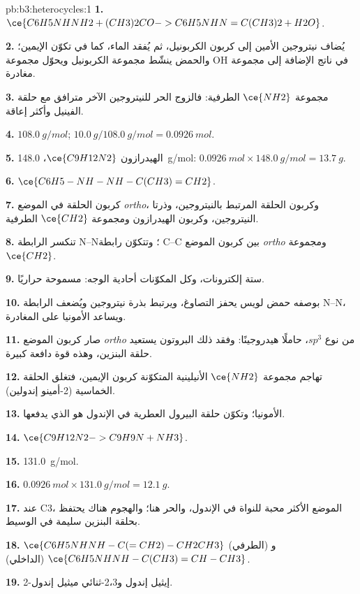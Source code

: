 \begin{solution}{pb:b3:heterocycles:1}
\textbf{1.} $\ce{C6H5NHNH2 + (CH3)2CO -> C6H5NHN=C(CH3)2 + H2O}$.

\textbf{2.} يُضاف نيتروجين الأمين إلى كربون الكربونيل، ثم يُفقد الماء، كما في
تكوّن الإيمين؛ والحمض ينشّط مجموعة الكربونيل ويحوّل مجموعة OH في ناتج الإضافة
إلى مجموعة مغادرة.

\textbf{3.} مجموعة $\ce{NH2}$ الطرفية: فالزوج الحر للنيتروجين الآخر مترافق مع
حلقة الفينيل وأكثر إعاقة.

\textbf{4.} $\qty{108.0}{g/mol}$; $\qty{10.0}{g}/\qty{108.0}{g/mol} = \qty{0.0926}{mol}$.

\textbf{5.} الهيدرازون $\ce{C9H12N2}$، \qty{148.0}{g/mol}: $\qty{0.0926}{mol} \times \qty{148.0}{g/mol} = \qty{13.7}{g}$.

\textbf{6.} $\ce{C6H5-NH-NH-C(CH3)=CH2}$.

\textbf{7.} كربون الحلقة في الموضع \textit{ortho}، وكربون الحلقة المرتبط بالنيتروجين، وذرتا النيتروجين، وكربون الهيدرازون
ومجموعة $\ce{CH2}$ الطرفية.

\textbf{8.} تنكسر الرابطة N--N؛ وتتكوّن رابطة C--C بين كربون الموضع \textit{ortho} ومجموعة $\ce{CH2}$.

\textbf{9.} ستة إلكترونات، وكل المكوّنات أحادية الوجه: مسموحة حراريًا.

\textbf{10.} بوصفه حمض لويس يحفز التصاوغ، ويرتبط بذرة نيتروجين 
ويُضعف الرابطة N--N، ويساعد الأمونيا على المغادرة.

\textbf{11.} صار كربون الموضع \textit{ortho} من نوع $sp^3$، حاملًا هيدروجينًا: وفقد ذلك البروتون
يستعيد حلقة البنزين، وهذه قوة دافعة كبيرة.

\textbf{12.} تهاجم مجموعة $\ce{NH2}$ الأنيلينية المتكوّنة كربون الإيمين، فتغلق
الحلقة الخماسية (2-أمينو إندولين).

\textbf{13.} الأمونيا؛ وتكوّن حلقة البيرول العطرية في الإندول هو الذي يدفعها.

\textbf{14.} $\ce{C9H12N2 -> C9H9N + NH3}$.

\textbf{15.} \qty{131.0}{g/mol}.

\textbf{16.} $\qty{0.0926}{mol} \times \qty{131.0}{g/mol} = \qty{12.1}{g}$.

\textbf{17.} عند C3، الموضع الأكثر محبة للنواة في الإندول، والحر هنا؛ والهجوم هناك
يحتفظ بحلقة البنزين سليمة في الوسيط.

\textbf{18.} $\ce{C6H5NHNH-C(=CH2)-CH2CH3}$ (الطرفي) و$\ce{C6H5NHNH-C(CH3)=CH-CH3}$ (الداخلي).

\textbf{19.} 2-إيثيل إندول و2،3-ثنائي ميثيل إندول.


\end{solution}
